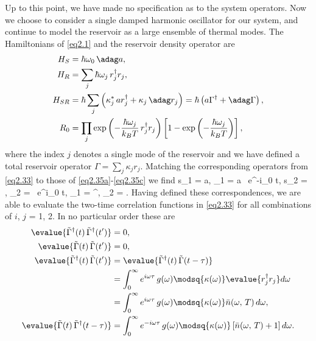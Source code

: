 Up to this point, we have made no specification as to the system operators. Now we choose to consider a single damped harmonic oscillator for our system, and continue to model the reservoir as a large ensemble of thermal modes. The Hamiltonians of \eqref{eq2.1} and the reservoir density operator are
%
\begin{subequations} \begin{align}
H_S &= \hbar\omega_0 \, \adag a, \label{eq2.35a} \\
H_R &= \sum_j \hbar\omega_j \, r^{\dag}_j r_j, \label{eq2.35b} \\
H_{SR} &= \hbar \sum_j \left( \kappa^{\ast}_j \, a r^{\dag}_j + \kappa_j \, \adag r_j \right) = \hbar \left( a \Gamma^{\dag} + \adag \Gamma \right), \label{eq2.35c} \\
R_0 &= \prod_j \exp \left( -\frac{\hbar\omega_j}{k_B T} \, r^{\dag}_j r_j \right) \left[ 1 - \exp \left( -\frac{\hbar\omega_j}{k_B T} \right) \right], \label{eq2.35d} \end{align} \end{subequations}
%
where the index $j$ denotes a single mode of the reservoir and we have defined a total reservoir operator $\Gamma = \sum_j \kappa_j r_j$. Matching the corresponding operators from \eqref{eq2.33} to those of \eqref{eq2.35a}-\eqref{eq2.35c} we find
%
\be s_1 = a, \quad {}_1 = a \, e^{-i\omega_0 t}, \quad s_2 = \adag, \quad {}_2 = \adag \, e^{i\omega_0 t}, \quad \Gamma_1 = \Gamma^{\dag}, \quad \Gamma_2 = \Gamma. \label{eq2.36} \ee
%
Having defined these correspondences, we are able to evaluate the two-time correlation functions in \eqref{eq2.33} for all combinations of $i$, $j$ = 1, 2. In no particular order these are
%
\begin{subequations} \begin{align}
\evalue{\tilde{\Gamma}^{\dag}(t) \, \tilde{\Gamma}^{\dag}(t')} &= 0, \label{eq2.37a} \\
\evalue{\tilde{\Gamma}(t) \, \tilde{\Gamma}(t')} &= 0, \label{eq2.37b} \\
\evalue{\tilde{\Gamma}^{\dag}(t) \, \tilde{\Gamma}(t')} &= \evalue{\tilde{\Gamma}^{\dag}(t) \, \tilde{\Gamma}(t - \tau)} \nonumber \\
&= \int_0^{\infty} e^{i\omega\tau} \, g(\omega) \modsq{\kappa(\omega)} \evalue{r^{\dag}_j r_j} d\omega \nonumber \\
&= \int_0^{\infty} e^{i\omega\tau} \, g(\omega) \modsq{\kappa(\omega)} \bar{n}(\omega, \, T) \, d\omega, \label{eq2.37c} \\
\evalue{\tilde{\Gamma}(t) \, \tilde{\Gamma}^{\dag}(t - \tau)} &= \int_0^{\infty} e^{-i\omega\tau} \, g(\omega) \modsq{\kappa(\omega)} \left[ \bar{n}(\omega, \, T) + 1 \right] d\omega. \label{eq2.37d} \end{align} \end{subequations}
